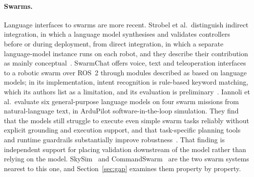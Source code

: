 \paragraph{Swarms.} Language interfaces to swarms are more recent. Strobel et al.\ distinguish
indirect integration, in which a language model synthesises and validates controllers before or
during deployment, from direct integration, in which a separate language-model instance runs on
each robot, and they describe their contribution as mainly conceptual~\cite{llm2swarm2024}.
SwarmChat offers voice, text and teleoperation interfaces to a robotic swarm over ROS~2 through
modules described as based on language models; in its implementation, intent recognition is
rule-based keyword matching, which its authors list as a limitation, and its evaluation is
preliminary~\cite{swarmchat2025}. Iannoli et al.\ evaluate six general-purpose language models on
four swarm missions from natural-language text, in ArduPilot software-in-the-loop simulation. They
find that the models still struggle to execute even simple swarm tasks reliably without explicit
grounding and execution support, and that task-specific planning tools and runtime guardrails
substantially improve robustness~\cite{iannoli2026}. That finding is independent support for placing
validation downstream of the model rather than relying on the model. SkySim~\cite{skysim2026} and
CommandSwarm~\cite{commandswarm2026} are the two swarm systems nearest to this one, and
Section~\ref{sec:gap} examines them property by property.

